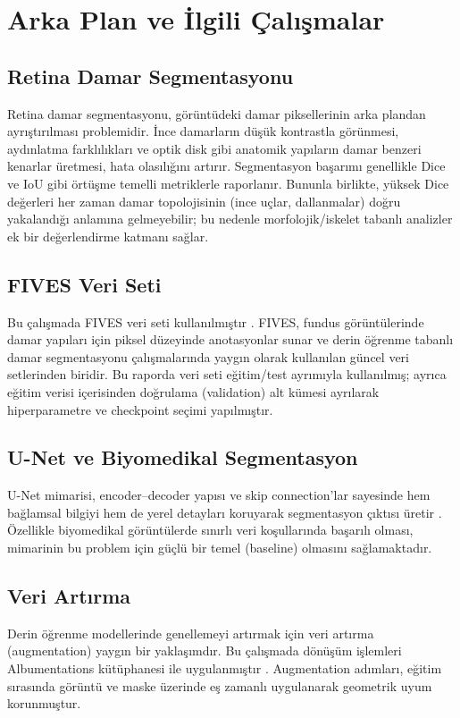 \section{Arka Plan ve İlgili Çalışmalar}
\subsection{Retina Damar Segmentasyonu}
Retina damar segmentasyonu, görüntüdeki damar piksellerinin arka plandan ayrıştırılması problemidir. İnce damarların düşük kontrastla görünmesi, aydınlatma farklılıkları ve optik disk gibi anatomik yapıların damar benzeri kenarlar üretmesi, hata olasılığını artırır. Segmentasyon başarımı genellikle Dice ve IoU gibi örtüşme temelli metriklerle raporlanır. Bununla birlikte, yüksek Dice değerleri her zaman damar topolojisinin (ince uçlar, dallanmalar) doğru yakalandığı anlamına gelmeyebilir; bu nedenle morfolojik/iskelet tabanlı analizler ek bir değerlendirme katmanı sağlar.

\subsection{FIVES Veri Seti}
Bu çalışmada FIVES veri seti kullanılmıştır \cite{jin2022fives}. FIVES, fundus görüntülerinde damar yapıları için piksel düzeyinde anotasyonlar sunar ve derin öğrenme tabanlı damar segmentasyonu çalışmalarında yaygın olarak kullanılan güncel veri setlerinden biridir. Bu raporda veri seti eğitim/test ayrımıyla kullanılmış; ayrıca eğitim verisi içerisinden doğrulama (validation) alt kümesi ayrılarak hiperparametre ve checkpoint seçimi yapılmıştır.

\subsection{U-Net ve Biyomedikal Segmentasyon}
U-Net mimarisi, encoder--decoder yapısı ve skip connection'lar sayesinde hem bağlamsal bilgiyi hem de yerel detayları koruyarak segmentasyon çıktısı üretir \cite{ronneberger2015unet}. Özellikle biyomedikal görüntülerde sınırlı veri koşullarında başarılı olması, mimarinin bu problem için güçlü bir temel (baseline) olmasını sağlamaktadır.

\subsection{Veri Artırma}
Derin öğrenme modellerinde genellemeyi artırmak için veri artırma (augmentation) yaygın bir yaklaşımdır. Bu çalışmada dönüşüm işlemleri Albumentations kütüphanesi ile uygulanmıştır \cite{buslaev2020albumentations}. Augmentation adımları, eğitim sırasında görüntü ve maske üzerinde eş zamanlı uygulanarak geometrik uyum korunmuştur.
